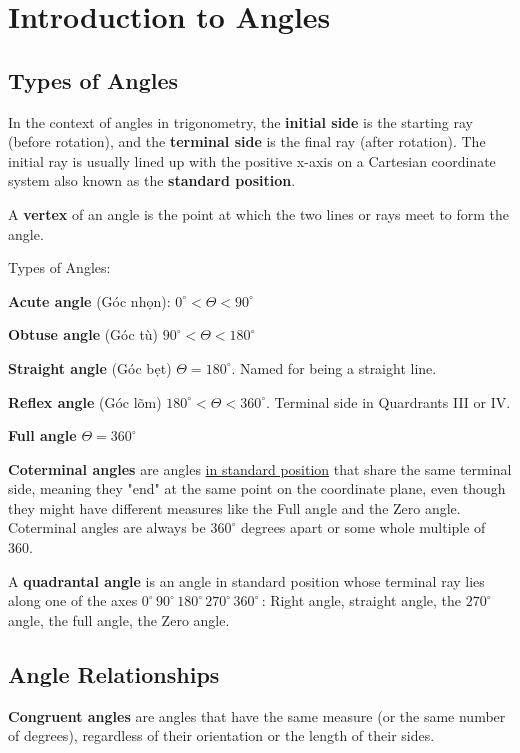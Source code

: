 \chapter{Introduction to Angles}

\section{Types of Angles}

In the context of angles in trigonometry, the \textbf{initial side} is the starting ray (before rotation), and the \textbf{terminal side} is the final ray (after rotation). The initial ray is usually lined up with the positive x-axis on a Cartesian coordinate system also known as the \textbf{standard position}.

A \textbf{vertex} of an angle is the point at which the two lines or rays meet to form the angle.

Types of Angles:

\textbf{Acute angle} (Góc nhọn): $0^{\circ} < \Theta < 90^{\circ}$

\textbf{Obtuse angle} (Góc tù) $90^{\circ} < \Theta < 180^{\circ}$

\textbf{Straight angle} (Góc bẹt) $\Theta = 180^{\circ}$. Named for being a straight line.

\textbf{Reflex angle} (Góc lõm) $180^{\circ} < \Theta < 360^{\circ}$. Terminal side in Quardrants III or IV.

\textbf{Full angle} $\Theta = 360^{\circ}$

\textbf{Coterminal angles} are angles \underline{in standard position} that share the same terminal side, meaning they "end" at the same point on the coordinate plane, even though they might have different measures like the Full angle and the Zero angle. Coterminal angles are always be $360^{\circ}$ degrees apart or some whole multiple of 360.

A \textbf{quadrantal angle} is an angle in standard position whose terminal ray lies along one of the axes $0^{\circ}\, 90^{\circ}\, 180^{\circ}\, 270^{\circ}\, 360^{\circ}\,$: Right angle, straight angle, the $270^{\circ}$ angle, the full angle, the Zero angle.

\section{Angle Relationships}

\textbf{Congruent angles} are angles that have the same measure (or the same number of degrees), regardless of their orientation or the length of their sides.

